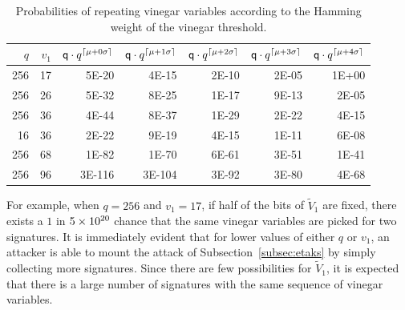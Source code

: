 \documentclass[english]{ufsc-thesis-rn46-2019/ufsc-thesis-rn46-2019}
\DeclarePairedDelimiter{\ceil}{\lceil}{\rceil}
\theoremstyle{definition}
\begin{document}
\begin{table}[htbp]
  \renewcommand{\arraystretch}{1.2}
  \setlength{\tabcolsep}{7pt}
  \centering
  \caption{Probabilities of repeating vinegar variables according to the
    Hamming weight of the vinegar threshold.}\label{tab:bin-prob}
  \begin{tabular}{*{7}{r}}
    \toprule
    $q$ & $v_{1}$
      & $\mathsf{q} \cdot q^{\ceil{\mu + 0\sigma}}$
      & $\mathsf{q} \cdot q^{\ceil{\mu + 1\sigma}}$
      & $\mathsf{q} \cdot q^{\ceil{\mu + 2\sigma}}$
      & $\mathsf{q} \cdot q^{\ceil{\mu + 3\sigma}}$
      & $\mathsf{q} \cdot q^{\ceil{\mu + 4\sigma}}$ \\ \midrule
    256 & 17 & \num{ 5E-20} & \num{ 4E-15} & \num{ 2E-10} & \num{ 2E-05}
      & \num{ 1E+00} \\
    256 & 26 & \num{ 5E-32} & \num{ 8E-25} & \num{ 1E-17} & \num{ 9E-13}
      & \num{ 2E-05} \\
    256 & 36 & \num{ 4E-44} & \num{ 8E-37} & \num{ 1E-29} & \num{ 2E-22}
      & \num{ 4E-15} \\
    16  & 36 & \num{ 2E-22} & \num{ 9E-19} & \num{ 4E-15} & \num{ 1E-11}
      & \num{ 6E-08} \\
    256 & 68 & \num{ 1E-82} & \num{ 1E-70} & \num{ 6E-61} & \num{ 3E-51}
      & \num{ 1E-41} \\
    256 & 96 & \num{3E-116} & \num{3E-104} & \num{ 3E-92} & \num{ 3E-80}
      & \num{ 4E-68} \\
    \bottomrule
  \end{tabular}
\end{table}

For example, when $q = 256$ and $v_{1} = 17$, if half of the bits of
$\widetilde{V}_{1}$ are fixed, there exists a $1$ in $\num{5E+20}$ chance that
the same vinegar variables are picked for two signatures. It is immediately
evident that for lower values of either $q$ or $v_{1}$, an attacker is able to
mount the attack of Subsection~\ref{subsec:etaks} by simply collecting more
signatures. Since there are few possibilities for $\widetilde{V}_{1}$, it is
expected that there is a large number of signatures with the same sequence of
vinegar variables.
\end{document}
